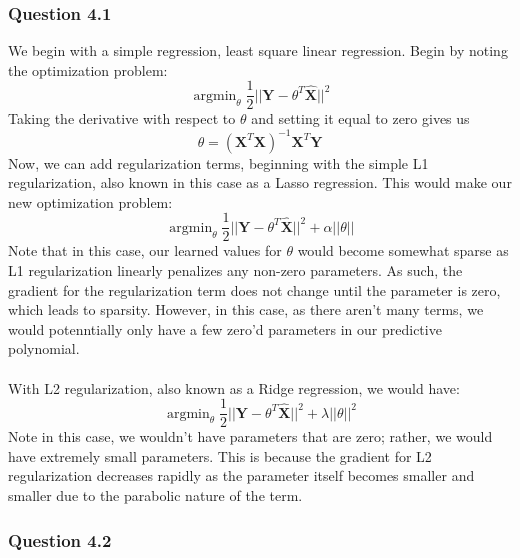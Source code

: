\documentclass[11pt,letterpaper]{article}
\DeclareMathOperator*{\argmin}{argmin}
\begin{document}
\subsubsection*{Question 4.1}
We begin with a simple regression, least square linear regression. Begin by 
noting the optimization problem:
\begin{equation}
    \argmin_{\theta} \dfrac{1}{2}||\textbf{Y}-\theta^T\hat{\textbf{X}}||^2
\end{equation}
Taking the derivative with respect to $\theta$ and setting it equal to zero 
gives us 
\begin{equation}
\theta = \left(\textbf{X}^T\textbf{X}\right)^{-1}\textbf{X}^T\textbf{Y}
\end{equation}
Now, we can add regularization terms, beginning with the simple L1 
regularization, also known in this case as a Lasso regression. This would make 
our new optimization problem:
\begin{equation}
    \argmin_{\theta} \dfrac{1}{2}||\textbf{Y}-\theta^T\hat{\textbf{X}}||^2 + 
    \alpha ||\theta||
\end{equation}
Note that in this case, our learned values for $\theta$ would become somewhat 
sparse as L1 regularization linearly penalizes any non-zero parameters.
As such, the gradient for the regularization term does not change until the 
parameter is zero, which leads to sparsity. However, in this case, as there 
aren't many terms, we would potenntially only have a few zero'd parameters in 
our predictive polynomial. \\ \\
With L2 regularization, also known as a Ridge regression, we would have:
\begin{equation}
    \argmin_{\theta} \dfrac{1}{2}||\textbf{Y}-\theta^T\hat{\textbf{X}}||^2 + 
    \lambda ||\theta||^2
\end{equation}
Note in this case, we wouldn't have parameters that are zero; rather, we would 
have extremely small parameters. This is because the gradient for L2 
regularization decreases rapidly as the parameter itself becomes smaller and 
smaller due to the parabolic nature of the term. 

\subsubsection*{Question 4.2}
\end{document}
